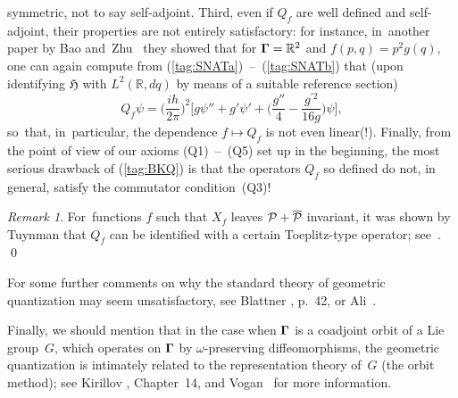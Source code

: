 \documentclass[11pt]{amsart}
\numberwithin{equation}{section}
\theoremstyle{remark}
\newtheorem{remark*}{Remark}
\newcommand\Omg{{\bigam}}   %
\newcommand\PP{{\Cal P}}
\newcommand\HH{\mathfrak H}
\newcommand\RR{\mathbb R}
\newcommand{\bigam}{\mbox{\boldmath $\Gamma$}}
\begin{document}
symmetric, not to say self-adjoint. Third, even if $Q_f$ are well defined and
self-adjoint, their properties are not entirely satisfactory: for instance,
in~another paper by Bao and~Zhu~\cite{bib:BaoZ} they showed that for
$\Omg=\RR^2$ and $f(p,q)=p^2 g(q)$, one can again compute from
(\ref{tag:SNATa})~--~(\ref{tag:SNATb}) that (upon identifying $\HH$ with
$L^2(\RR,dq)$ by means of a suitable reference section)
\begin{equation}  Q_f \psi = \Big(\frac{ih}{2\pi}\Big)^2 \Big[g\psi'' + g'\psi'
+ \Big( \frac{g''}4 - \frac{g^{\prime2}}{16g} \Big) \psi \Big] ,
\label{tag:BAOZ}  \end{equation}
so~that, in~particular, the dependence $f\mapsto Q_f$ is not even linear(!).
Finally, from the point of view of our axioms (Q1)~--~(Q5) set up in the
beginning, the most serious drawback of (\ref{tag:BKQ}) is that the operators
$Q_f$ so defined do not, in general, satisfy the commutator condition~(Q3)!

\begin{remark*} For~functions $f$ such that $X_f$ leaves $\PP+\overline\PP$
invariant, it was shown by Tuynman that $Q_f$ can be identified with a certain
Toeplitz-type operator; see~\cite{bib:TuyGBK}.  \qed  \end{remark*}

\medskip

For some further comments on why the standard theory of geometric quantization
may seem unsatisfactory, see Blattner \cite{bib:Blatt}, p.~42, or
Ali~\cite{bib:AliSurv}.

Finally, we should mention that in the case when $\Omg$ is a coadjoint orbit
of a Lie group~$G$, which operates on $\Omg$ by $\omega$-preserving
diffeomorphisms, the geometric quantization is intimately related to the
representation theory of~$G$ (the orbit method); see Kirillov \cite{bib:Kirr},
Chapter~14, and Vogan~ \cite{bib:Vogan} for more information.
\end{document}
